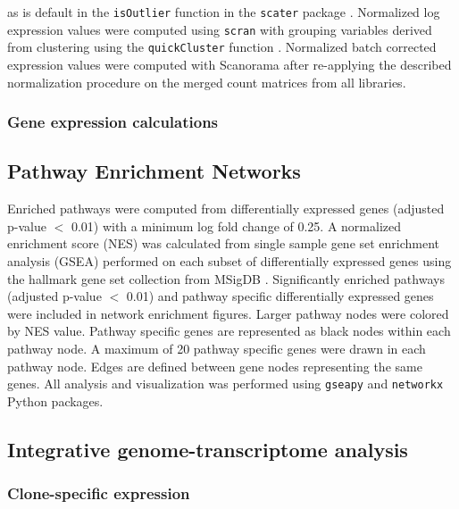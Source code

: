 \documentclass{article}
\begin{document}
as is default in the \texttt{isOutlier} function in the \texttt{scater} package \cite{mccarthy2017scater}. Normalized log expression values were computed using \texttt{scran} \cite{lun2016pooling} with grouping variables derived from clustering using the \texttt{quickCluster} function \cite{lun2016step}.  Normalized batch corrected expression values were computed with Scanorama \cite{hie2019efficient} after re-applying the described normalization procedure on the merged count matrices from all libraries.



\subsubsection{Gene expression calculations}

\subsection{Pathway Enrichment Networks}

Enriched pathways were computed from differentially expressed genes (adjusted p-value $<$ 0.01) with a minimum log fold change of 0.25.  A normalized enrichment score (NES) was calculated from single sample gene set enrichment analysis (GSEA) \cite{shi2007gene} performed on each subset of differentially expressed genes using the hallmark gene set collection from MSigDB \cite{liberzon2015molecular}.  Significantly enriched pathways (adjusted p-value $<$ 0.01) and pathway specific differentially expressed genes were included in network enrichment figures.  Larger pathway nodes were colored by NES value. Pathway specific genes are represented as black nodes within each pathway node.  A maximum of 20 pathway specific genes were drawn in each pathway node.  Edges are defined between gene nodes representing the same genes.  All analysis and visualization was performed using \texttt{gseapy} and \texttt{networkx} \cite{hagberg2008exploring} Python packages.


\subsection{Integrative genome-transcriptome analysis}




\subsubsection{Clone-specific expression}
\end{document}
